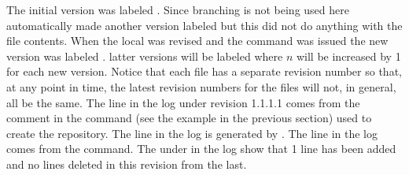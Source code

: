 The initial version was labeled . Since branching is not
being used here \cvs automatically made another version labeled
 but this did not do anything with the file contents. When the
local  was revised and the  command was
issued the new version was labeled . latter versions will be
labeled  where $n$ will be increased by 1 for each new
version. Notice that each file has a separate revision number so that,
at any point in time, the latest revision numbers for the files will
not, in general, all be the same. The  line in the log
under revision 1.1.1.1 comes from the  comment in the  command (see the example in the previous section) used to
create the  repository. The  line in the
log is generated by \cvs. The  line in the log
comes from the  command.  The  under
 in the log show that 1 line has been added and no
lines deleted in this revision from the last.

